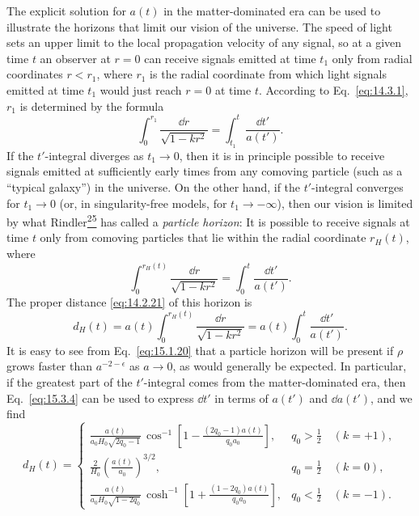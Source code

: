 The explicit solution for \(a(t)\) in the matter-dominated era can be used to
illustrate the horizons that limit our vision of the universe. The speed of
light sets an upper limit to the local propagation velocity of any signal, so
at a given time \(t\) an observer at \(r=0\) can receive signals emitted at
time \(t_1\) only from radial coordinates \(r<r_1\), where \(r_1\) is the
radial coordinate from which light signals emitted at time \(t_1\) would just
reach \(r=0\) at time \(t\). According to Eq.~\eqref{eq:14.3.1}, \(r_1\)
is determined by the formula
\begin{equation}
  \int_0^{r_1}\frac{\dd r}{\sqrt{1-kr^2}}
  =
  \int_{t_1}^{t}\frac{\dd t'}{a(t')}.
  \tag{15.3.31}\label{eq:15.3.31}
\end{equation}
If the \(t'\)-integral diverges as \(t_1\to0\), then it is in principle
possible to receive signals emitted at sufficiently early times from any
comoving particle (such as a ``typical galaxy'') in the universe. On the other
hand, if the \(t'\)-integral converges for \(t_1\to0\) (or, in
singularity-free models, for \(t_1\to-\infty\)), then our vision is limited
by what Rindler\hyperref[ch15-ref-25]{\textsuperscript{25}} has called a
\emph{particle horizon}: It is possible to receive signals at time \(t\) only
from comoving particles that lie within the radial coordinate \(r_H(t)\),
where
\[
  \int_0^{r_H(t)}\frac{\dd r}{\sqrt{1-kr^2}}
  =
  \int_0^t\frac{\dd t'}{a(t')}.
\]
The proper distance \eqref{eq:14.2.21} of this horizon is
\begin{equation}
  d_H(t)
  =
  a(t)\int_0^{r_H(t)}\frac{\dd r}{\sqrt{1-kr^2}}
  =
  a(t)\int_0^t\frac{\dd t'}{a(t')}.
  \tag{15.3.32}\label{eq:15.3.32}
\end{equation}
It is easy to see from Eq.~\eqref{eq:15.1.20} that a particle horizon will
be present if \(\rho\) grows faster than \(a^{-2-\epsilon}\) as \(a\to0\),
as would generally be expected. In particular, if the greatest part of the
\(t'\)-integral comes from the matter-dominated era, then
Eq.~\eqref{eq:15.3.4} can be used to express \(\dd t'\) in terms of
\(a(t')\) and \(\dd a(t')\), and we find
\begin{equation}
  d_H(t)
  =
  \begin{cases}
    \displaystyle
    \frac{a(t)}{a_0H_0\sqrt{2q_0-1}}\,
    \cos^{-1}
    \left[
      1-\frac{(2q_0-1)a(t)}{q_0a_0}
    \right],
    &q_0>\tfrac12\quad(k=+1),\\[1.2em]
    \displaystyle
    \frac2{H_0}\left(\frac{a(t)}{a_0}\right)^{3/2},
    &q_0=\tfrac12\quad(k=0),\\[1.2em]
    \displaystyle
    \frac{a(t)}{a_0H_0\sqrt{1-2q_0}}\,
    \cosh^{-1}
    \left[
      1+\frac{(1-2q_0)a(t)}{q_0a_0}
    \right],
    &q_0<\tfrac12\quad(k=-1).
  \end{cases}
  \tag{15.3.33}\label{eq:15.3.33}
\end{equation}
